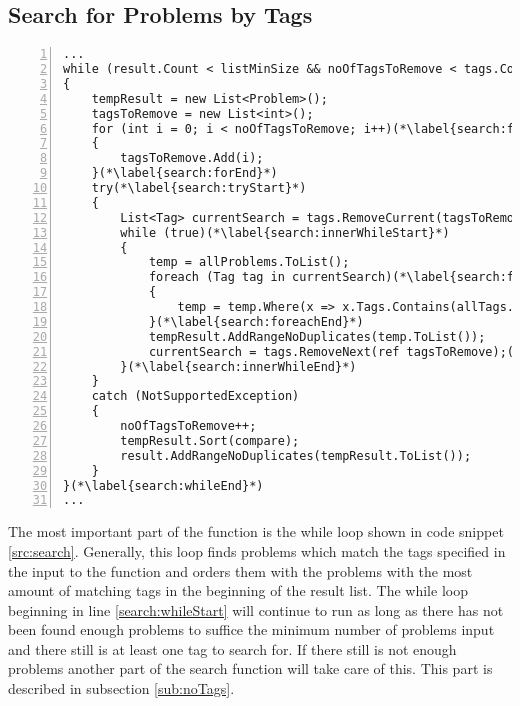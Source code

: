 \subsection{Search for Problems by Tags}
\label{sub:searchTags}
\begin{lstlisting}[style=sourceCode, caption=\myCaption{The while loop which finds and sorts problems matching the input tags}, label=src:search, numbers=left, numberstyle=\footnotesize,float=hp]
...
while (result.Count < listMinSize && noOfTagsToRemove < tags.Count)(*\label{search:whileStart}*)
{
	tempResult = new List<Problem>();
	tagsToRemove = new List<int>();
	for (int i = 0; i < noOfTagsToRemove; i++)(*\label{search:forStart}*)
	{
		tagsToRemove.Add(i);
	}(*\label{search:forEnd}*)
	try(*\label{search:tryStart}*)
	{
		List<Tag> currentSearch = tags.RemoveCurrent(tagsToRemove);
		while (true)(*\label{search:innerWhileStart}*)
		{
			temp = allProblems.ToList();
			foreach (Tag tag in currentSearch)(*\label{search:foreachStart}*)
			{
				temp = temp.Where(x => x.Tags.Contains(allTags.FirstOrDefault(y => y.Id == tag.Id))).ToList();
			}(*\label{search:foreachEnd}*)
			tempResult.AddRangeNoDuplicates(temp.ToList());
			currentSearch = tags.RemoveNext(ref tagsToRemove);(*\label{search:removeNext}*)
		}(*\label{search:innerWhileEnd}*)
	}
	catch (NotSupportedException)
	{
		noOfTagsToRemove++;
		tempResult.Sort(compare);
		result.AddRangeNoDuplicates(tempResult.ToList());
	}
}(*\label{search:whileEnd}*)
...
\end{lstlisting}

The most important part of the  function is the while loop shown in code snippet \ref{src:search}.
Generally, this loop finds problems which match the tags specified in the input to the function and orders them with the problems with the most amount of matching tags in the beginning of the result list.
The while loop beginning in line \ref{search:whileStart} will continue to run as long as there has not been found enough problems to suffice the minimum number of problems input and there still is at least one tag to search for.
If there still is not enough problems another part of the search function will take care of this.
This part is described in subsection \ref{sub:noTags}.

